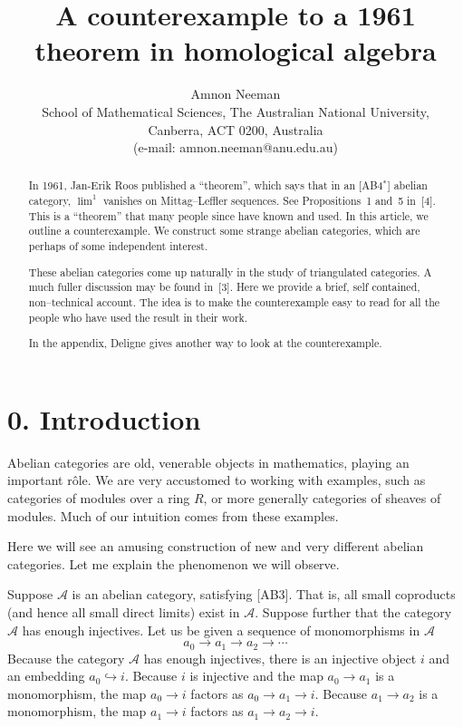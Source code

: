 \documentclass[11pt,a4paper]{article}
\title{A counterexample to a 1961 theorem in homological algebra}
\author{Amnon Neeman\\
\small School of Mathematical Sciences, The Australian National University,\\
\small Canberra, ACT 0200, Australia\\
\small (e-mail: amnon.neeman@anu.edu.au)}
\date{}
\theoremstyle{plain}
\theoremstyle{definition}
\numberwithin{equation}{section}
\begin{document}
\maketitle

\begin{abstract}
In 1961, Jan-Erik Roos published a ``theorem'', which says that in an [AB4$^{*}$] abelian category, $\lim\nolimits^{1}$ vanishes on Mittag--Leffler sequences. See Propositions~1 and~5 in~[4]. This is a ``theorem'' that many people since have known and used. In this article, we outline a counterexample. We construct some strange abelian categories, which are perhaps of some independent interest.

These abelian categories come up naturally in the study of triangulated categories. A much fuller discussion may be found in~[3]. Here we provide a brief, self contained, non--technical account. The idea is to make the counterexample easy to read for all the people who have used the result in their work.

In the appendix, Deligne gives another way to look at the counterexample.
\end{abstract}

\section*{0. Introduction}

Abelian categories are old, venerable objects in mathematics, playing an important r\^{o}le. We are very accustomed to working with examples, such as categories of modules over a ring $R$, or more generally categories of sheaves of modules. Much of our intuition comes from these examples.

Here we will see an amusing construction of new and very different abelian categories. Let me explain the phenomenon we will observe.

Suppose $\mathcal{A}$ is an abelian category, satisfying [AB3]. That is, all small coproducts (and hence all small direct limits) exist in $\mathcal{A}$. Suppose further that the category $\mathcal{A}$ has enough injectives. Let us be given a sequence of monomorphisms in $\mathcal{A}$
\begin{equation*}
a_{0} \longrightarrow a_{1} \longrightarrow a_{2} \longrightarrow \cdots
\end{equation*}
Because the category $\mathcal{A}$ has enough injectives, there is an injective object $i$ and an embedding $a_{0} \hookrightarrow i$. Because $i$ is injective and the map $a_{0} \to a_{1}$ is a monomorphism, the map $a_{0} \to i$ factors as $a_{0} \to a_{1} \to i$. Because $a_{1} \to a_{2}$ is a monomorphism, the map $a_{1} \to i$ factors as $a_{1} \to a_{2} \to i$.
\end{document}
